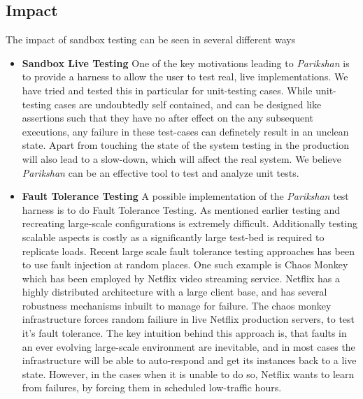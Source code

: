 \subsection{Impact}
\label{sec:impact}

The impact of sandbox testing can be seen in several different ways

\begin{itemize}
  \item \textbf{Sandbox Live Testing}
    One of the key motivations leading to \emph{Parikshan} is to provide a harness to allow the user to test real, live implementations. 
We have tried and tested this in particular for unit-testing cases. 
While unit-testing cases are undoubtedly self contained, and can be designed like assertions such that they have no after effect on the any subsequent executions, any failure in these test-cases can definetely result in an unclean state.
Apart from touching the state of the system testing in the production will also lead to a slow-down, which will affect the real system.
We believe \emph{Parikshan} can be an effective tool to test and analyze unit tests.

  \item \textbf{Fault Tolerance Testing}
    A possible implementation of the \emph{Parikshan} test harness is to do Fault Tolerance Testing.
As mentioned earlier testing and recreating large-scale configurations is extremely difficult.
Additionally testing scalable aspects is costly as a significantly large test-bed is required to replicate loads. 
Recent large scale fault tolerance testing approaches has been to use fault injection at random places.
One such example is Chaos Monkey\cite{chaosmonkey} which has been employed by Netflix \cite{netflix} video streaming service. 
Netflix has a highly distributed architecture with a large client base, and has several robustness mechanisms inbuilt to manage for failure. 
The chaos monkey infrastructure forces random failiure in live Netflix production servers, to test it's fault tolerance.
The key intuition behind this approach is, that faults in an ever evolving large-scale environment are inevitable, and in most cases the infrastructure will be able to auto-respond and get its instances back to a live state. 
However, in the cases when it is unable to do so, Netflix wants to learn from failures, by forcing them in scheduled low-traffic hours.


\end{itemize}
